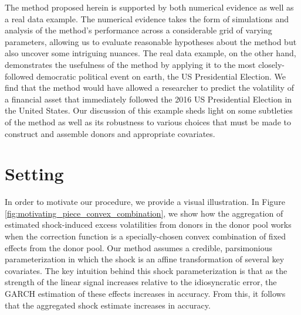 \documentclass[11pt,3p,review,authoryear]{elsarticle}
\theoremstyle{definition}
\begin{document}
The method proposed herein is supported by both numerical evidence as well as a real data example.  The numerical evidence takes the form of simulations and analysis of the method's performance across a considerable grid of varying parameters, allowing us to evaluate reasonable hypotheses about the method but also uncover some intriguing nuances.  The real data example, on the other hand, demonstrates the usefulness of the method by applying it to the most closely-followed democratic political event on earth, the US Presidential Election.  We find that the method would have allowed a researcher to predict the volatility of a financial asset that immediately followed the 2016 US Presidential Election in the United States.  Our discussion of this example sheds light on some subtleties of the method as well as its robustness to various choices that must be made to construct and assemble donors and appropriate covariates.

\section{Setting}\label{Setting}

In order to motivate our procedure, we provide a visual illustration.  In Figure \ref{fig:motivating_piece_convex_combination}, we show how the aggregation of estimated shock-induced excess volatilities from donors in the donor pool works when the correction function is a specially-chosen convex combination of fixed effects from the donor pool.  Our method assumes a credible, parsimonious parameterization in which the shock is an affine transformation of several key covariates.  The key intuition behind this shock parameterization is that as the strength of the linear signal increases relative to the idiosyncratic error, the GARCH estimation of these effects increases in accuracy.  From this, it follows that the aggregated shock estimate increases in accuracy.
\end{document}
